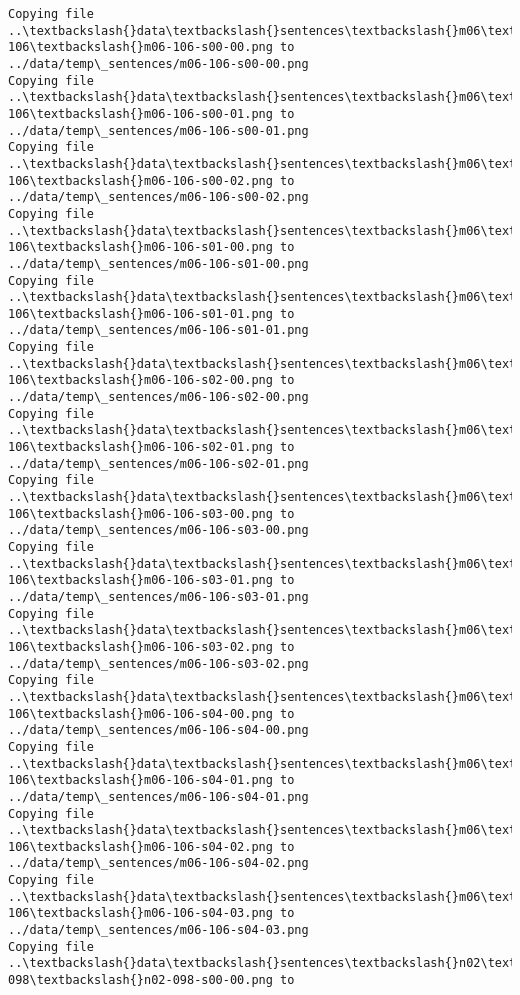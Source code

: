 \documentclass[11pt]{article}
\begin{document}
\begin{Verbatim}[commandchars=\\\{\}]
Copying file ..\textbackslash{}data\textbackslash{}sentences\textbackslash{}m06\textbackslash{}m06-106\textbackslash{}m06-106-s00-00.png to
../data/temp\_sentences/m06-106-s00-00.png
Copying file ..\textbackslash{}data\textbackslash{}sentences\textbackslash{}m06\textbackslash{}m06-106\textbackslash{}m06-106-s00-01.png to
../data/temp\_sentences/m06-106-s00-01.png
Copying file ..\textbackslash{}data\textbackslash{}sentences\textbackslash{}m06\textbackslash{}m06-106\textbackslash{}m06-106-s00-02.png to
../data/temp\_sentences/m06-106-s00-02.png
Copying file ..\textbackslash{}data\textbackslash{}sentences\textbackslash{}m06\textbackslash{}m06-106\textbackslash{}m06-106-s01-00.png to
../data/temp\_sentences/m06-106-s01-00.png
Copying file ..\textbackslash{}data\textbackslash{}sentences\textbackslash{}m06\textbackslash{}m06-106\textbackslash{}m06-106-s01-01.png to
../data/temp\_sentences/m06-106-s01-01.png
Copying file ..\textbackslash{}data\textbackslash{}sentences\textbackslash{}m06\textbackslash{}m06-106\textbackslash{}m06-106-s02-00.png to
../data/temp\_sentences/m06-106-s02-00.png
Copying file ..\textbackslash{}data\textbackslash{}sentences\textbackslash{}m06\textbackslash{}m06-106\textbackslash{}m06-106-s02-01.png to
../data/temp\_sentences/m06-106-s02-01.png
Copying file ..\textbackslash{}data\textbackslash{}sentences\textbackslash{}m06\textbackslash{}m06-106\textbackslash{}m06-106-s03-00.png to
../data/temp\_sentences/m06-106-s03-00.png
Copying file ..\textbackslash{}data\textbackslash{}sentences\textbackslash{}m06\textbackslash{}m06-106\textbackslash{}m06-106-s03-01.png to
../data/temp\_sentences/m06-106-s03-01.png
Copying file ..\textbackslash{}data\textbackslash{}sentences\textbackslash{}m06\textbackslash{}m06-106\textbackslash{}m06-106-s03-02.png to
../data/temp\_sentences/m06-106-s03-02.png
Copying file ..\textbackslash{}data\textbackslash{}sentences\textbackslash{}m06\textbackslash{}m06-106\textbackslash{}m06-106-s04-00.png to
../data/temp\_sentences/m06-106-s04-00.png
Copying file ..\textbackslash{}data\textbackslash{}sentences\textbackslash{}m06\textbackslash{}m06-106\textbackslash{}m06-106-s04-01.png to
../data/temp\_sentences/m06-106-s04-01.png
Copying file ..\textbackslash{}data\textbackslash{}sentences\textbackslash{}m06\textbackslash{}m06-106\textbackslash{}m06-106-s04-02.png to
../data/temp\_sentences/m06-106-s04-02.png
Copying file ..\textbackslash{}data\textbackslash{}sentences\textbackslash{}m06\textbackslash{}m06-106\textbackslash{}m06-106-s04-03.png to
../data/temp\_sentences/m06-106-s04-03.png
Copying file ..\textbackslash{}data\textbackslash{}sentences\textbackslash{}n02\textbackslash{}n02-098\textbackslash{}n02-098-s00-00.png to

\end{Verbatim}
\end{document}

